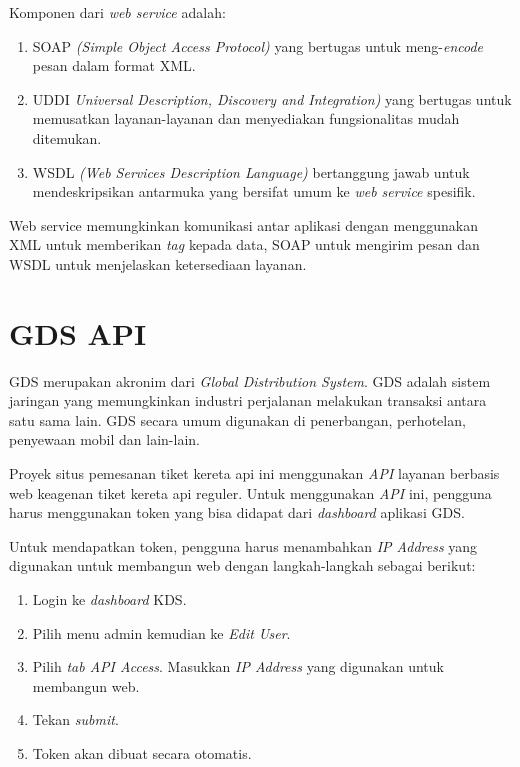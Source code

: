 Komponen dari \textit{web service} adalah:

\begin{enumerate}
    \item SOAP \textit{(Simple Object Access Protocol)} yang bertugas untuk meng-\textit{encode} pesan dalam format XML.
    \item UDDI \textit{Universal Description, Discovery and Integration)} yang bertugas untuk memusatkan layanan-layanan dan menyediakan fungsionalitas mudah ditemukan.
    \item WSDL \textit{(Web Services Description Language)} bertanggung jawab untuk mendeskripsikan antarmuka yang bersifat umum ke \textit{web service} spesifik.
\end{enumerate}

Web service memungkinkan komunikasi antar aplikasi dengan menggunakan XML untuk memberikan \textit{tag} kepada data, SOAP untuk mengirim pesan dan WSDL untuk menjelaskan ketersediaan layanan. ~\cite{cardoso:06:webservice}

\section{GDS API}
\label{sec:gdsapi} 

GDS merupakan akronim dari \textit{Global Distribution System}. GDS adalah sistem jaringan yang memungkinkan industri perjalanan melakukan transaksi antara satu sama lain. GDS secara umum digunakan di penerbangan, perhotelan, penyewaan mobil dan lain-lain.

Proyek situs pemesanan tiket kereta api ini menggunakan \textit{API} layanan berbasis web keagenan tiket kereta api reguler. Untuk menggunakan \textit{API} ini, pengguna harus menggunakan token yang bisa didapat dari \textit{dashboard} aplikasi GDS.

Untuk mendapatkan token, pengguna harus menambahkan \textit{IP Address} yang digunakan untuk membangun web dengan langkah-langkah sebagai berikut:

\begin{enumerate}
    \item Login ke \textit{dashboard} KDS.
    \item Pilih menu admin kemudian ke \textit{Edit User}.
    \item Pilih \textit{tab API Access}. Masukkan \textit{IP Address} yang digunakan untuk membangun web. 
    \item Tekan \textit{submit}.
    \item Token akan dibuat secara otomatis. 
\end{enumerate}

